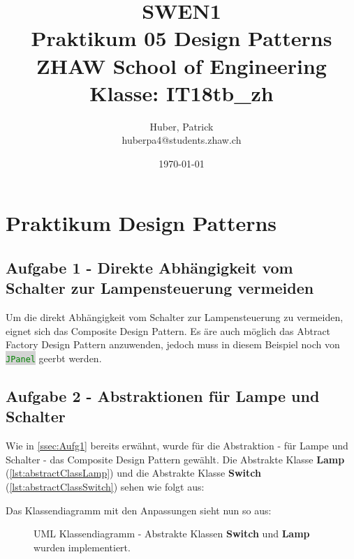 \documentclass[11pt,ngerman]{article}
\newcommand{\inlinecode}[2]{\colorbox{lightgray}{\lstinline[language=#1]$#2$}}
\begin{document}
    \title{SWEN1\\Praktikum 05 Design Patterns\\
        \vspace{1cm}
        \small{ZHAW  School of Engineering\\Klasse: IT18tb\_zh}
        \vspace{1.5cm}
    }
    \author{
        Huber, Patrick\\
        \small{huberpa4@students.zhaw.ch}
        \vspace{1.5cm}
    }
   \date{\today}

    \maketitle
    \newpage

    \tableofcontents
    \listoffigures
    \lstlistoflistings
    \newpage

    \section{Praktikum Design Patterns}

    \subsection{Aufgabe 1 - Direkte Abhängigkeit vom Schalter zur Lampensteuerung vermeiden}
    \label{ssec:Aufg1}
    Um die direkt Abhängigkeit vom Schalter zur Lampensteuerung zu vermeiden, eignet sich das Composite Design Pattern. Es äre auch möglich das Abtract Factory Design Pattern anzuwenden, jedoch muss in diesem Beispiel noch von \inlinecode{Java}{JPanel} geerbt werden.

     \subsection{Aufgabe 2 - Abstraktionen für Lampe und Schalter}
    Wie in \autoref{ssec:Aufg1} bereits erwähnt, wurde für die Abstraktion - für Lampe und Schalter - das Composite Design Pattern gewählt. \newline Die Abstrakte Klasse \textbf{Lamp} (\autoref{lst:abstractClassLamp})  und die Abstrakte Klasse \textbf{Switch} (\autoref{lst:abstractClassSwitch})  sehen wie folgt aus:
     \vspace{.25cm}
    
    \vspace{.5cm}
    
    \vspace{.5cm}
    Das Klassendiagramm mit den Anpassungen sieht nun so aus:
    \begin{figure}[H]
        \centering
        \caption{UML Klassendiagramm  - Abstrakte Klassen \textbf{Switch} und \textbf{Lamp} wurden  implementiert.}
        \label{fig:ClassDiagram_Aufg2}
    \end{figure}
\end{document}
